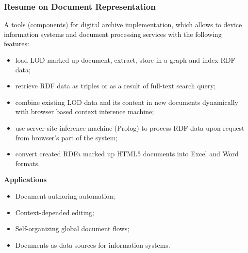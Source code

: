 \documentclass[10pt]{beamer}
\begin{document}
\begin{frame}
  \frametitle{Resume on Document Representation}
A tools (components) for digital archive implementation, which allows
to device information systems and document processing services
with the following features:
\begin{itemize}
\item load LOD marked up document, extract, store in a graph and index RDF data;
\item retrieve RDF data as triples or as a result of full-text search query;
\item combine existing LOD data and its content in new documents dynamically with browser based context inference machine;
\item use server-site inference machine (Prolog) to process RDF data upon
  request from browser's part of the system;
\item convert created RDFa marked up HTML5 documents into Excel and Word formats.
\end{itemize}

  \textbf{Applications}
  \begin{itemize}
  \item Document authoring automation;
  \item Context-depended editing;
  \item Self-organizing global document flows;
  \item Documents as data sources for information systems.
  \end{itemize}

\end{frame}
\end{document}
